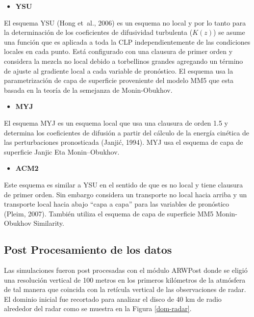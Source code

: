 \documentclass[12pt,spanish,oneside, a4paper]{book}
\providecommand{\tightlist}{%
  \setlength{\itemsep}{0pt}\setlength{\parskip}{0pt}}
\begin{document}
\begin{itemize}
\tightlist
\item
  \textbf{YSU}
\end{itemize}

El esquema YSU (Hong et~al., 2006) es un esquema no local y por lo tanto
para la determinación de los coeficientes de difusividad turbulenta
(\(K(z)\)) se asume una función que es aplicada a toda la CLP
independientemente de las condiciones locales en cada punto. Está
configurado con una clausura de primer orden y considera la mezcla no
local debido a torbellinos grandes agregando un término de ajuste al
gradiente local a cada variable de pronóstico. El esquema usa la
parametrización de capa de superficie proveniente del modelo MM5 que
esta basada en la teoría de la semejanza de Monin-Obukhov.

\begin{itemize}
\tightlist
\item
  \textbf{MYJ}
\end{itemize}

El esquema MYJ es un esquema local que usa una clausura de orden 1.5 y
determina los coeficientes de difusión a partir del cálculo de la
energía cinética de las perturbaciones pronosticada (Janjić, 1994). MYJ
usa el esquema de capa de superficie Janjic Eta Monin--Obukhov.

\begin{itemize}
\tightlist
\item
  \textbf{ACM2}
\end{itemize}

Este esquema es similar a YSU en el sentido de que es no local y tiene
clausura de primer orden. Sin embargo considera un transporte no local
hacia arriba y un transporte local hacia abajo ``capa a capa'' para las
variables de pronóstico (Pleim, 2007). También utiliza el esquema de
capa de superficie MM5 Monin-Obukhov Similarity.

\subsection{Post Procesamiento de los
datos}\label{post-procesamiento-de-los-datos}

Las simulaciones fueron post procesadas con el módulo ARWPost donde se
eligió una resolución vertical de 100 metros en los primeros kilómetros
de la atmósfera de tal manera que coincida con la retícula vertical de
las observaciones de radar. El dominio inicial fue recortado para
analizar el disco de 40 km de radio alrededor del radar como se muestra
en la Figura \ref{dom-radar}.
\end{document}
